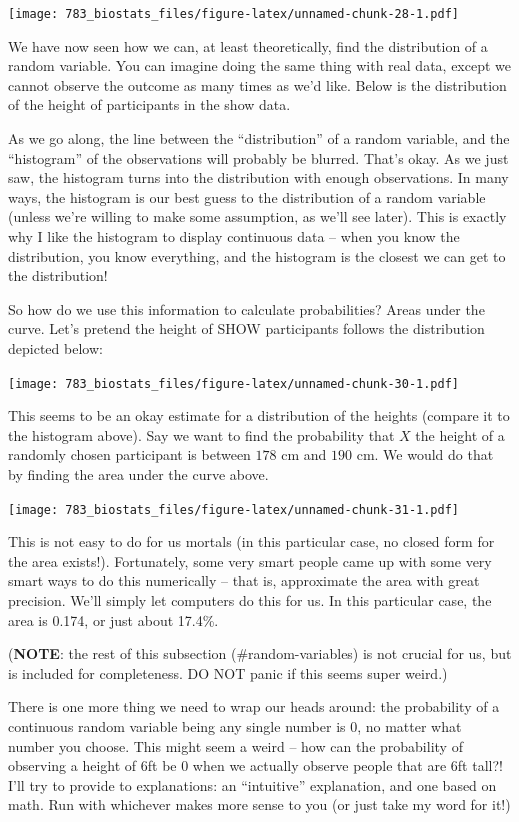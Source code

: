 \documentclass[]{book}
\theoremstyle{definition}
\theoremstyle{definition}
\theoremstyle{definition}
\theoremstyle{remark}
\begin{document}
\texttt{[image: 783\_biostats\_files/figure-latex/unnamed-chunk-28-1.pdf]}

We have now seen how we can, at least theoretically, find the distribution of a random variable. You can imagine doing the same thing with real data, except we cannot observe the outcome as many times as we'd like. Below is the distribution of the height of participants in the show data.

\hypertarget{htmlwidget-4ba537f5e22a1317c3f2}{}

As we go along, the line between the ``distribution'' of a random variable, and the ``histogram'' of the observations will probably be blurred. That's okay. As we just saw, the histogram turns into the distribution with enough observations. In many ways, the histogram is our best guess to the distribution of a random variable (unless we're willing to make some assumption, as we'll see later). This is exactly why I like the histogram to display continuous data -- when you know the distribution, you know everything, and the histogram is the closest we can get to the distribution!

So how do we use this information to calculate probabilities? Areas under the curve. Let's pretend the height of SHOW participants follows the distribution depicted below:

\texttt{[image: 783\_biostats\_files/figure-latex/unnamed-chunk-30-1.pdf]}

This seems to be an okay estimate for a distribution of the heights (compare it to the histogram above). Say we want to find the probability that \(X\) the height of a randomly chosen participant is between \(178\) cm and \(190\) cm. We would do that by finding the area under the curve above.

\texttt{[image: 783\_biostats\_files/figure-latex/unnamed-chunk-31-1.pdf]}

This is not easy to do for us mortals (in this particular case, no closed form for the area exists!). Fortunately, some very smart people came up with some very smart ways to do this numerically -- that is, approximate the area with great precision. We'll simply let computers do this for us. In this particular case, the area is 0.174, or just about 17.4\%.

(\textbf{NOTE}: the rest of this subsection (\#random-variables) is not crucial for us, but is included for completeness. DO NOT panic if this seems super weird.)

There is one more thing we need to wrap our heads around: the probability of a continuous random variable being any single number is \(0\), no matter what number you choose. This might seem a weird -- how can the probability of observing a height of 6ft be \(0\) when we actually observe people that are 6ft tall?! I'll try to provide to explanations: an ``intuitive'' explanation, and one based on math. Run with whichever makes more sense to you (or just take my word for it!)
\end{document}
